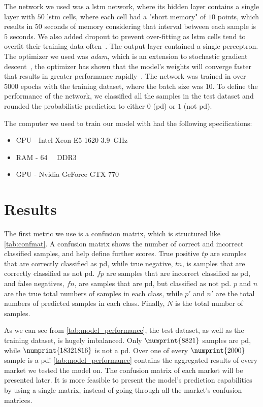 The network we used was a \ac{lstm} network, where its hidden layer contains a single layer with $50$ \ac{lstm} cells, where each cell had a "short memory" of $10$ points, which results in $50$ seconds of memory considering that interval between each sample is $5$ seconds. We also added dropout to prevent over-fitting as \ac{lstm} cells tend to overfit their training data often~\cite{overfit}. The output layer contained a single perceptron. The optimizer we used was \emph{adam}, which is an extension to stochastic gradient descent~\cite{kingma2014adam}, the optimizer has shown that the model's weights will converge faster that results in greater performance rapidly~\cite{adam}. The network was trained in over $5000$ epochs with the training dataset, where the batch size was $10$. To define the performance of the network, we classified all the samples in the test dataset and rounded the probabilistic prediction to either $0$ (\ac{pd}) or $1$ (not \ac{pd}). 

The computer we used to train our model with had the following specifications:
\begin{itemize}
    \item CPU - Intel Xeon E5-1620 \SI{3.9}{\giga\hertz}
    \item RAM - \SI{64}{\gibi\byte} DDR3 
    \item GPU - Nvidia GeForce GTX 770
\end{itemize}

\section{Results}
The first metric we use is a confusion matrix, which is structured like \autoref{tab:confmat}. A confusion matrix shows the number of correct and incorrect classified samples, and help define further scores. True positive $tp$ are samples that are correctly classified as \ac{pd}, while true negative, $tn$, is samples that are correctly classified as not \ac{pd}. $fp$ are samples that are incorrect classified as \ac{pd}, and false negatives, $fn$, are samples that are \ac{pd}, but classified as not \ac{pd}. $p$ and $n$ are the true total numbers of samples in each class, while $p'$ and $n'$ are the total numbers of predicted samples in each class. Finally, $N$ is the total number of samples.




As we can see from \autoref{tab:model_performance}, the test dataset, as well as the training dataset, is hugely imbalanced. Only $\numprint{8821}$ samples are \ac{pd}, while $\numprint{18321816}$ is not a \ac{pd}. Over one of every $\numprint{2000}$ sample is a \ac{pd}! \autoref{tab:model_performance} contains the aggregated results of every market we tested the model on. The confusion matrix of each market will be presented later. It is more feasible to present the model's prediction capabilities by using a single matrix, instead of going through all the market's confusion matrices.

